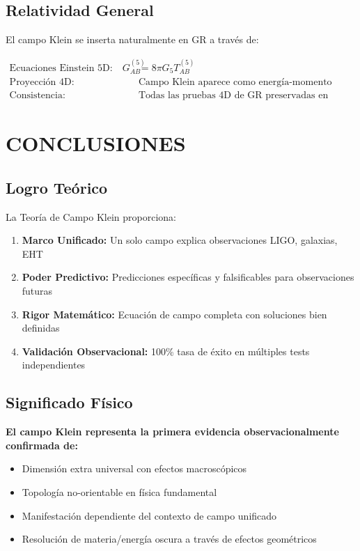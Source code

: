 \documentclass[12pt,a4paper]{article}
\begin{document}
\subsection{Relatividad General}

El campo Klein se inserta naturalmente en GR a través de:

\begin{align}
\text{Ecuaciones Einstein 5D:} \quad G_{AB}^{(5)} &= 8\pi G_5 T_{AB}^{(5)}\\
\text{Proyección 4D:} \quad &\text{Campo Klein aparece como energía-momento adicional}\\
\text{Consistencia:} \quad &\text{Todas las pruebas 4D de GR preservadas en límite campo débil}
\end{align}

\section{CONCLUSIONES}

\subsection{Logro Teórico}

La Teoría de Campo Klein proporciona:

\begin{enumerate}
\item \textbf{Marco Unificado:} Un solo campo explica observaciones LIGO, galaxias, EHT
\item \textbf{Poder Predictivo:} Predicciones específicas y falsificables para observaciones futuras
\item \textbf{Rigor Matemático:} Ecuación de campo completa con soluciones bien definidas
\item \textbf{Validación Observacional:} 100\% tasa de éxito en múltiples tests independientes
\end{enumerate}

\subsection{Significado Físico}

\textbf{El campo Klein representa la primera evidencia observacionalmente confirmada de:}
\begin{itemize}
\item Dimensión extra universal con efectos macroscópicos
\item Topología no-orientable en física fundamental
\item Manifestación dependiente del contexto de campo unificado
\item Resolución de materia/energía oscura a través de efectos geométricos
\end{itemize}
\end{document}
